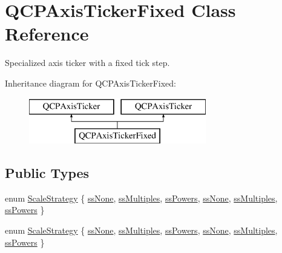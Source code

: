 \hypertarget{class_q_c_p_axis_ticker_fixed}{}\section{Q\+C\+P\+Axis\+Ticker\+Fixed Class Reference}
\label{class_q_c_p_axis_ticker_fixed}


Specialized axis ticker with a fixed tick step.  


Inheritance diagram for Q\+C\+P\+Axis\+Ticker\+Fixed\+:\begin{figure}[H]
\begin{center}
\leavevmode
\includegraphics[height=2.000000cm]{class_q_c_p_axis_ticker_fixed}
\end{center}
\end{figure}
\subsection*{Public Types}
\begin{DoxyCompactItemize}
\item 
enum \hyperlink{class_q_c_p_axis_ticker_fixed_a15b3d38b935d404b1311eb85cfb6a439}{Scale\+Strategy} \{ \newline
\hyperlink{class_q_c_p_axis_ticker_fixed_a15b3d38b935d404b1311eb85cfb6a439a5a515bf0c906eae47ef5d5e31eb9f818}{ss\+None}, 
\hyperlink{class_q_c_p_axis_ticker_fixed_a15b3d38b935d404b1311eb85cfb6a439a410f5c537f577b9dda33cb0152b756c6}{ss\+Multiples}, 
\hyperlink{class_q_c_p_axis_ticker_fixed_a15b3d38b935d404b1311eb85cfb6a439ab965e069729e3426a0b18c54a5ac6afd}{ss\+Powers}, 
\hyperlink{class_q_c_p_axis_ticker_fixed_a15b3d38b935d404b1311eb85cfb6a439a5a515bf0c906eae47ef5d5e31eb9f818}{ss\+None}, 
\newline
\hyperlink{class_q_c_p_axis_ticker_fixed_a15b3d38b935d404b1311eb85cfb6a439a410f5c537f577b9dda33cb0152b756c6}{ss\+Multiples}, 
\hyperlink{class_q_c_p_axis_ticker_fixed_a15b3d38b935d404b1311eb85cfb6a439ab965e069729e3426a0b18c54a5ac6afd}{ss\+Powers}
 \}
\item 
enum \hyperlink{class_q_c_p_axis_ticker_fixed_a15b3d38b935d404b1311eb85cfb6a439}{Scale\+Strategy} \{ \newline
\hyperlink{class_q_c_p_axis_ticker_fixed_a15b3d38b935d404b1311eb85cfb6a439a5a515bf0c906eae47ef5d5e31eb9f818}{ss\+None}, 
\hyperlink{class_q_c_p_axis_ticker_fixed_a15b3d38b935d404b1311eb85cfb6a439a410f5c537f577b9dda33cb0152b756c6}{ss\+Multiples}, 
\hyperlink{class_q_c_p_axis_ticker_fixed_a15b3d38b935d404b1311eb85cfb6a439ab965e069729e3426a0b18c54a5ac6afd}{ss\+Powers}, 
\hyperlink{class_q_c_p_axis_ticker_fixed_a15b3d38b935d404b1311eb85cfb6a439a5a515bf0c906eae47ef5d5e31eb9f818}{ss\+None}, 
\newline
\hyperlink{class_q_c_p_axis_ticker_fixed_a15b3d38b935d404b1311eb85cfb6a439a410f5c537f577b9dda33cb0152b756c6}{ss\+Multiples}, 
\hyperlink{class_q_c_p_axis_ticker_fixed_a15b3d38b935d404b1311eb85cfb6a439ab965e069729e3426a0b18c54a5ac6afd}{ss\+Powers}
 \}
\end{DoxyCompactItemize}
